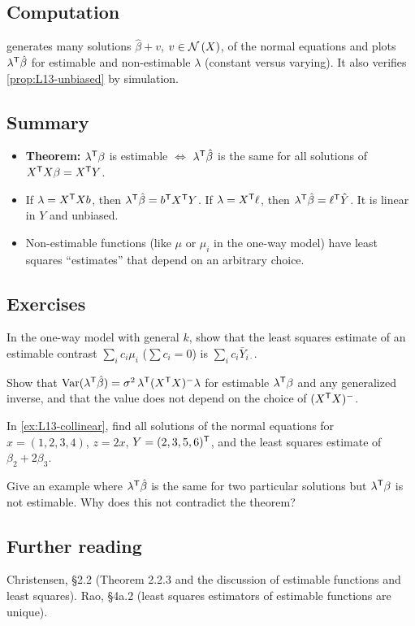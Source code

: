 \subsection{Computation}
 generates many solutions $\hat\beta+v$, $v\in\mathcal{N}\left(X\right)$, of the
normal equations and plots $\lambda^{\mathsf T}\hat\beta$ for estimable and non-estimable $\lambda$ (constant versus varying).
It also verifies \cref{prop:L13-unbiased} by simulation.

\subsection{Summary}
\begin{itemize}
  \item \textbf{Theorem:} $\lambda^{\mathsf T}\beta$ is estimable $\iff$ $\lambda^{\mathsf T}\hat\beta$ is the same for all solutions of $X^{\mathsf T} X\beta=X^{\mathsf T} Y$.
  \item If $\lambda=X^{\mathsf T} Xb$, then $\lambda^{\mathsf T}\hat\beta=b^{\mathsf T} X^{\mathsf T} Y$. If $\lambda=X^{\mathsf T}\ell$, then $\lambda^{\mathsf T}\hat\beta=\ell^{\mathsf T}\hat Y$. It is linear in $Y$ and unbiased.
  \item Non-estimable functions (like $\mu$ or $\mu_i$ in the one-way model) have least squares ``estimates'' that depend on an arbitrary choice.
\end{itemize}

\subsection{Exercises}
\begin{problem}\label{prob:L13-1}
In the one-way model with general $k$, show that the least squares estimate of an estimable contrast $\sum_i c_i\mu_i$ ($\sum c_i=0$) is $\sum_i c_i\bar Y_{i\cdot}$.
\end{problem}
\begin{problem}\label{prob:L13-2}
Show that $\operatorname{Var}(\lambda^{\mathsf T}\hat\beta)=\sigma^2\,\lambda^{\mathsf T}(X^{\mathsf T} X)^{-}\lambda$ for estimable $\lambda^{\mathsf T}\beta$ and any generalized inverse, and that the value does not depend on the choice of $(X^{\mathsf T} X)^{-}$.
\end{problem}
\begin{problem}\label{prob:L13-3}
In \cref{ex:L13-collinear}, find all solutions of the normal equations for $x=(1,2,3,4)$, $z=2x$, $Y=(2,3,5,6)^{\mathsf T}$, and the least squares estimate of $\beta_2+2\beta_3$.
\end{problem}
\begin{problem}\label{prob:L13-4}
Give an example where $\lambda^{\mathsf T}\hat\beta$ is the same for two particular solutions but $\lambda^{\mathsf T}\beta$ is not estimable. Why does this not contradict the theorem?
\end{problem}

\subsection{Further reading}
Christensen, \S2.2 (Theorem 2.2.3 and the discussion of estimable functions and least squares).
Rao, \S4a.2 (least squares estimators of estimable functions are unique).
